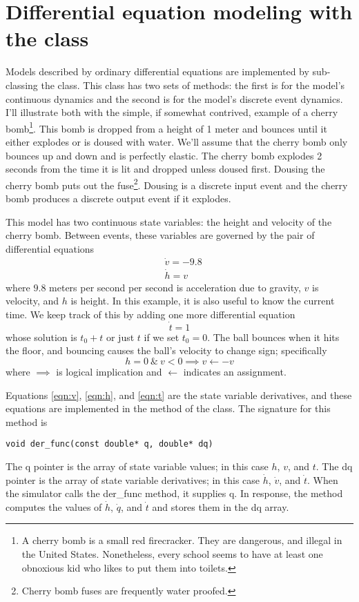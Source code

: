 \section{Differential equation modeling with the  class}
Models described by ordinary differential equations are implemented by sub-classing the  class. This class has two sets of methods: the first is for the model's continuous dynamics and the second is for the model's discrete event dynamics. I'll illustrate both with the simple, if somewhat contrived, example of a cherry bomb\footnote{A cherry bomb is a small red firecracker. They are dangerous, and illegal in the United States. Nonetheless, every school seems to have at least one obnoxious kid who likes to put them into toilets.}. This bomb is dropped from a height of 1 meter and bounces until it either explodes or is doused with water. We'll assume that the cherry bomb only bounces up and down and is perfectly elastic. The cherry bomb explodes 2 seconds from the time it is lit and dropped unless doused first. Dousing the cherry bomb puts out the fuse\footnote{Cherry bomb fuses are frequently water proofed.}. Dousing is a discrete input event and the cherry bomb produces a discrete output event if it explodes. 

This model has two continuous state variables: the height and velocity of the cherry bomb. Between events, these variables are governed by the pair of differential equations
\begin{align}
&\dot{v} = -9.8 \label{eqn:v} \\
&\dot{h} = v \label{eqn:h}
\end{align}
where $9.8$ meters per second per second is acceleration due to gravity, $v$ is velocity, and $h$ is height. In this example, it is also useful to know the current time. We keep track of this by adding one more differential equation
\begin{equation}
\dot{t} = 1 \label{eqn:t}
\end{equation}
whose solution is $t_0 + t$ or just $t$ if we set $t_0 = 0$. The ball bounces when it hits the floor, and bouncing causes the ball's velocity to change sign; specifically
\begin{equation}
h = 0 \ \& \ v < 0 \implies v \leftarrow -v \label{eqn:state_event}
\end{equation}
where $\implies$ is logical implication and $\leftarrow$ indicates an assignment. 

Equations \ref{eqn:v}, \ref{eqn:h}, and \ref{eqn:t} are the state variable derivatives, and these equations are implemented in the  method of the  class. The signature for this method is
\begin{verbatim}
void der_func(const double* q, double* dq)
\end{verbatim}
The q pointer is the array of state variable values; in this case $h$, $v$, and $t$. The dq pointer is the array of state variable derivatives; in this case $\dot{h}$, $\dot{v}$, and $\dot{t}$. When the simulator calls the der\_func method, it supplies q. In response, the method computes the values of $\dot{h}$, $\dot{q}$, and $\dot{t}$ and stores them in the dq array.

